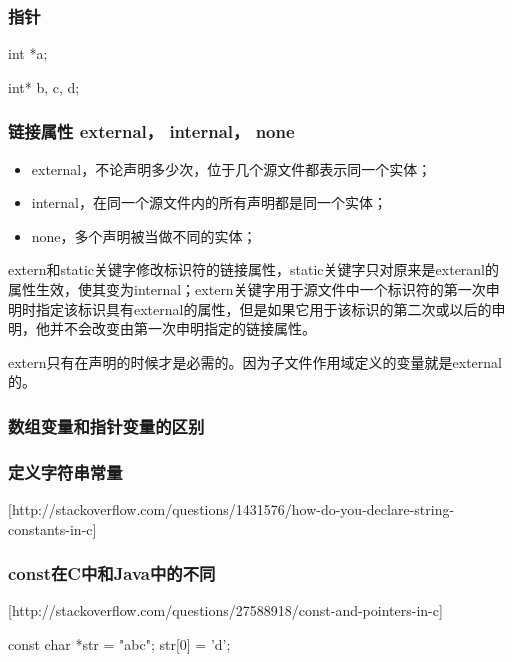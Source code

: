 \subsubsection{指针}

\begin{C}[最好使用的写法是这样]
int *a;
\end{C}

\begin{C}
int* b, c, d;
\end{C}

\subsubsection{链接属性 external， internal， none}

\begin{itemize}
\item external，不论声明多少次，位于几个源文件都表示同一个实体；
\item internal，在同一个源文件内的所有声明都是同一个实体；
\item none，多个声明被当做不同的实体；
\end{itemize}

extern和static关键字修改标识符的链接属性，static关键字只对原来是exteranl的属性生效，使其变为internal；extern关键字用于源文件中一个标识符的第一次申明时指定该标识具有external的属性，但是如果它用于该标识的第二次或以后的申明，他并不会改变由第一次申明指定的链接属性。


extern只有在声明的时候才是必需的。因为子文件作用域定义的变量就是external的。

\subsubsection{数组变量和指针变量的区别}

\subsubsection{定义字符串常量}
[http://stackoverflow.com/questions/1431576/how-do-you-declare-string-constants-in-c]

\subsubsection{const在C中和Java中的不同}
[http://stackoverflow.com/questions/27588918/const-and-pointers-in-c]

\begin{C}[为什么这样会有编译错误呢？]
const char *str = "abc";
str[0] = 'd';
\end{C}

